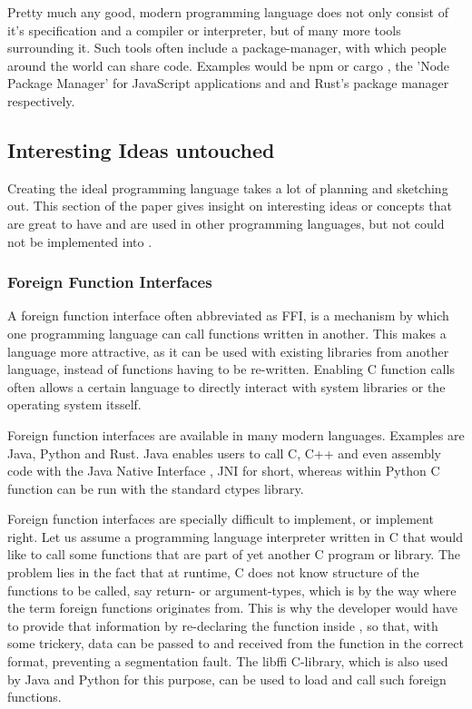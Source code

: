 \documentclass[12pt,a4paper]{report}
\newcommand{\cte}[1] {
    \cite{#1}
}
\begin{document}
Pretty much any good, modern programming language does not only consist
of it's specification and a compiler or interpreter, but of many more
tools surrounding it.
Such tools often include a package-manager, with which people around the world
can share code. Examples would be npm\cte{npm} or cargo\cte{cargo}, 
the 'Node Package Manager' for JavaScript applications and and Rust's package 
manager respectively.

\subsection{Interesting Ideas untouched}
Creating the ideal programming language takes a lot of planning and sketching
out. This section of the paper gives insight on interesting ideas or concepts
that are great to have and are used in other programming languages, but not 
could not be implemented into \name.

\subsubsection{Foreign Function Interfaces}
A foreign function interface\cte{FFI} often abbreviated as FFI,
is a mechanism by which one programming language can call functions written 
in another. This makes a language more attractive, as it can be used with
existing libraries from another language, instead of functions having to be
re-written. Enabling C function calls often allows a certain language to
directly interact with system libraries or the operating system itsself.

Foreign function interfaces are available in many modern languages.
Examples are Java, Python and Rust.
Java enables users to call C, C++ and even assembly code with the Java Native
Interface\cte{JNI}, JNI for short, whereas within Python C function can
be run with the standard ctypes\cte{ctypes} library.

Foreign function interfaces are specially difficult to implement, or implement
right. Let us assume a programming language interpreter \name written in C that
would like to call some functions that are part of yet another C program or
library. The problem lies in the fact that at runtime, C does not know
structure of the functions to be called, say return- or argument-types, which
is by the way where the term foreign functions originates from. This is why the
\name developer would have to provide that information by re-declaring the
function inside \name, so that, with some trickery, data can be passed to and
received from the function in the correct format, preventing a segmentation
fault. The libffi\cte{libffi} C-library, which is also used by Java and
Python for this purpose, can be used to load and call such foreign functions.
\end{document}
